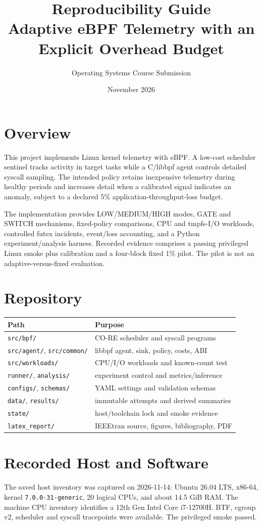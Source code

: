 \documentclass[10pt]{article}
\title{Reproducibility Guide\\Adaptive eBPF Telemetry with an Explicit Overhead Budget}
\author{Operating Systems Course Submission}
\date{November 2026}
\begin{document}
\maketitle

\section{Overview}
This project implements Linux kernel telemetry with eBPF. A low-cost scheduler sentinel tracks activity in target tasks while a C/libbpf agent controls detailed syscall sampling. The intended policy retains inexpensive telemetry during healthy periods and increases detail when a calibrated signal indicates an anomaly, subject to a declared 5\% application-throughput-loss budget.

The implementation provides LOW/MEDIUM/HIGH modes, GATE and SWITCH mechanisms, fixed-policy comparisons, CPU and tmpfs-I/O workloads, controlled futex incidents, event/loss accounting, and a Python experiment/analysis harness. Recorded evidence comprises a passing privileged Linux smoke plus calibration and a four-block fixed 1\% pilot. The pilot is not an adaptive-versus-fixed evaluation.

\section{Repository}
\begin{tabular}{@{}ll@{}}
\toprule
Path & Purpose\\
\midrule
\texttt{src/bpf/} & CO-RE scheduler and syscall programs\\
\texttt{src/agent/}, \texttt{src/common/} & libbpf agent, sink, policy, costs, ABI\\
\texttt{src/workloads/} & CPU/I/O workloads and known-count test\\
\texttt{runner/}, \texttt{analysis/} & experiment control and metrics/inference\\
\texttt{configs/}, \texttt{schemas/} & YAML settings and validation schemas\\
\texttt{data/}, \texttt{results/} & immutable attempts and derived summaries\\
\texttt{state/} & host/toolchain lock and smoke evidence\\
\texttt{latex\_report/} & IEEEtran source, figures, bibliography, PDF\\
\bottomrule
\end{tabular}

\section{Recorded Host and Software}
The saved host inventory was captured on 2026-11-14: Ubuntu 26.04 LTS, x86-64, kernel \texttt{7.0.0-31-generic}, 20 logical CPUs, and about 14.5 GiB RAM. The machine CPU inventory identifies a 12th Gen Intel Core i7-12700H. BTF, cgroup v2, scheduler and syscall tracepoints were available. The privileged smoke passed.
\end{document}
